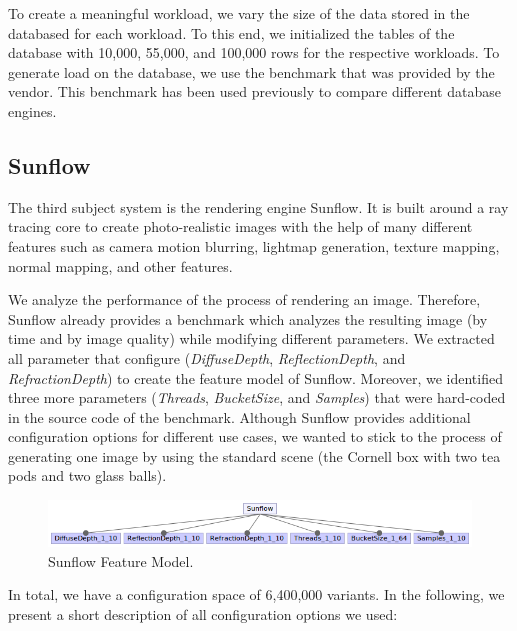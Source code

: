 To create a meaningful workload, we vary the size of the data stored in the databased for each workload. To this end, we initialized the tables of the database with 10,000, 55,000, and 100,000 rows for the respective workloads. To generate load on the database, we use the benchmark that was provided by the vendor. This benchmark has been used previously to compare different database engines.

\subsection{Sunflow}

The third subject system is the rendering engine Sunflow. It is built around a ray tracing core to create photo-realistic images with the help of many different features such as camera motion blurring, lightmap generation, texture mapping, normal mapping, and other features. 

We analyze the performance of the process of rendering an image. Therefore, Sunflow already provides a benchmark which analyzes the resulting image (by time and by image quality) while modifying different parameters. We extracted all parameter that configure (\textit{DiffuseDepth}, \textit{ReflectionDepth}, and \textit{RefractionDepth}) to create the feature model of Sunflow. Moreover, we identified three more parameters (\textit{Threads}, \textit{BucketSize}, and \textit{Samples}) that were hard-coded in the source code of the benchmark. Although Sunflow provides additional configuration options for different use cases, we wanted to stick to the process of generating one image by using the standard scene (the Cornell box with two tea pods and two glass balls).

\begin{figure}
  \centering
  \includegraphics[width=\textwidth]{images/Sunflow_Feature_model}
  \caption{Sunflow Feature Model.}
  \label{fm_sunflow}
\end{figure}

In total, we have a configuration space of 6,400,000 variants. In the following, we present a short description of all configuration options we used:

